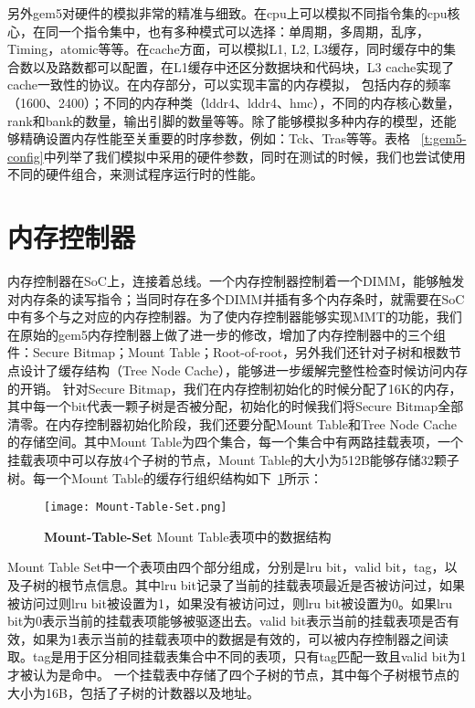 另外gem5对硬件的模拟非常的精准与细致。在cpu上可以模拟不同指令集的cpu核心，在同一个指令集中，也有多种模式可以选择：单周期，多周期，乱序，Timing，atomic等等。在cache方面，可以模拟L1, L2, L3缓存，同时缓存中的集合数以及路数都可以配置，在L1缓存中还区分数据块和代码块，L3 cache实现了cache一致性的协议。在内存部分，可以实现丰富的内存模拟，
包括内存的频率（1600、2400）；不同的内存种类（lddr4、lddr4、hmc），不同的内存核心数量，rank和bank的数量，输出引脚的数量等等。除了能够模拟多种内存的模型，还能够精确设置内存性能至关重要的时序参数，例如：Tck、Tras等等。表格 ~\ref{t:gem5-config}中列举了我们模拟中采用的硬件参数，同时在测试的时候，我们也尝试使用不同的硬件组合，来测试程序运行时的性能。

\section{内存控制器}
内存控制器在SoC上，连接着总线。一个内存控制器控制着一个DIMM，能够触发对内存条的读写指令；当同时存在多个DIMM并插有多个内存条时，就需要在SoC中有多个与之对应的内存控制器。为了使内存控制器能够实现MMT的功能，我们在原始的gem5内存控制器上做了进一步的修改，增加了内存控制器中的三个组件：Secure Bitmap；Mount Table；Root-of-root，另外我们还针对子树和根数节点设计了缓存结构（Tree Node Cache），能够进一步缓解完整性检查时候访问内存的开销。
针对Secure Bitmap，我们在内存控制初始化的时候分配了16K的内存，其中每一个bit代表一颗子树是否被分配，初始化的时候我们将Secure Bitmap全部清零。在内存控制器初始化阶段，我们还要分配Mount Table和Tree Node Cache的存储空间。其中Mount Table为四个集合，每一个集合中有两路挂载表项，一个挂载表项中可以存放4个子树的节点，Mount Table的大小为512B能够存储32颗子树。每一个Mount Table的缓存行组织结构如下~\ref{fig:Mount-Table-Set.png}所示：

\begin{figure}[!htp]
    \centering
    \texttt{[image: Mount-Table-Set.png]}
    \caption{\textbf{Mount-Table-Set }Mount Table表项中的数据结构}
   \label{fig:Mount-Table-Set.png}
\end{figure}
Mount Table Set中一个表项由四个部分组成，分别是lru bit，valid bit，tag，以及子树的根节点信息。其中lru bit记录了当前的挂载表项最近是否被访问过，如果被访问过则lru bit被设置为1，如果没有被访问过，则lru bit被设置为0。如果lru bit为0表示当前的挂载表项能够被驱逐出去。valid bit表示当前的挂载表项是否有效，如果为1表示当前的挂载表项中的数据是有效的，可以被内存控制器之间读取。tag是用于区分相同挂载表集合中不同的表项，只有tag匹配一致且valid bit为1才被认为是命中。
一个挂载表中存储了四个子树的节点，其中每个子树根节点的大小为16B，包括了子树的计数器以及地址。

